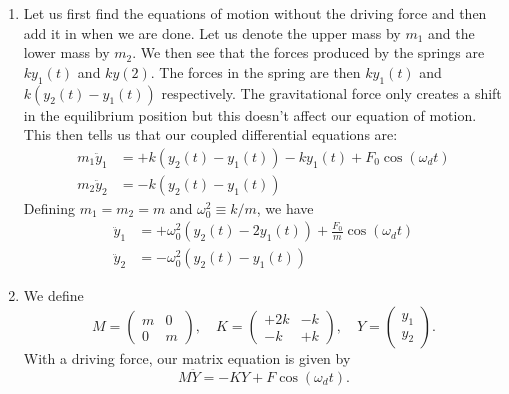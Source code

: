 \begin{sol}
\begin{enumerate}[label=\textbf{(\alph*)}] 
\item Let us first find the equations of motion without the driving force and then add it in when we are done. Let us denote the upper mass by $m_1$ and the lower mass by $m_2$. We then see that the forces produced by the springs are $ky_1 (t)$ and $ky (2)$. The forces in the spring are then $ky_1 (t)$ and $k (y_2 (t) - y_1 (t))$ respectively. The gravitational force only creates a shift in the equilibrium position but this doesn't affect our equation of motion. This then tells us that our coupled differential equations are:
\begin{align*}
    m_1 \ddot{y}_1 &= + k(y_2(t) - y_1 (t)) - ky_1 (t) + F_0 \cos (\omega_d t) \\ 
    m_2 \ddot{y}_2 &= -k (y_2 (t) - y_1 (t))
\end{align*}
Defining $m_1 = m_2 = m$ and $\omega_0^2 \equiv k/m$, we have 
\begin{align*}
    \ddot{y}_1 &= + \omega_0^2(y_2(t) - 2y_1 (t)) + \frac{F_0}{m}\cos (\omega_d t) \\ 
    \ddot{y}_2 &= -\omega_0^2(y_2 (t) - y_1 (t))
\end{align*}

\item We define 
\[M = \begin{pmatrix}
m & 0 \\ 
0 & m 
\end{pmatrix}, 
\quad 
K = \begin{pmatrix}
+2k & -k \\
-k & +k
\end{pmatrix}
, \quad 
Y = \begin{pmatrix}
y_1 \\ 
y_2
\end{pmatrix}
.\]
With a driving force, our matrix equation is given by 
\[M\ddot{Y} = -K Y + F\cos (\omega_d t).\]


\end{enumerate}
\end{sol}

